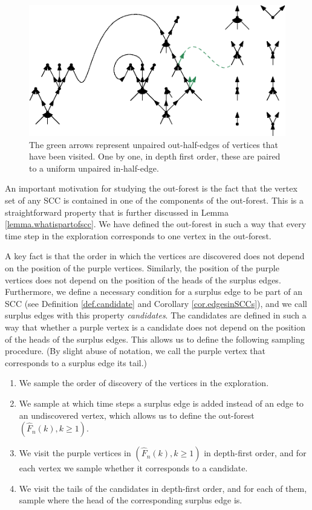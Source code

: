 \begin{figure}
    \centering
    \includegraphics[scale=0.6]{Content/Pictures/configuration_model.eps}
    \caption{The green arrows represent unpaired out-half-edges of vertices that have been visited. One by one, in depth first order, these are paired to a uniform unpaired in-half-edge.}
    \label{fig.configuration model}
\end{figure}

An important motivation for studying the out-forest is the fact that the vertex set of any SCC is contained in one of the components of the out-forest. This is a straightforward property that is further discussed in Lemma \ref{lemma.whatispartofscc}. We have defined the out-forest in such a way that every time step in the exploration corresponds to one vertex in the out-forest. 

A key fact is that the order in which the vertices are discovered does not depend on the position of the purple vertices. Similarly, the position of the purple vertices does not depend on the position of the heads of the surplus edges. Furthermore, we define a necessary condition for a surplus edge to be part of an SCC (see Definition \ref{def.candidate} and Corollary \ref{cor.edgesinSCCs}), and we call surplus edges with this property \emph{candidates}. The candidates are defined in such a way that whether a purple vertex is a candidate does not depend on the position of the heads of the surplus edges. This allows us to define the following sampling procedure. (By slight abuse of notation, we call the purple vertex that corresponds to a surplus edge its tail.)
\begin{enumerate}
    \item We sample the order of discovery of the vertices in the exploration.
    \item We sample at which time steps a surplus edge is added instead of an edge to an undiscovered vertex, which allows us to define the out-forest $(\hat{F}_n(k),k\geq 1)$. 
    \item We visit the purple vertices in $(\hat{F}_n(k),k\geq 1)$ in depth-first order, and for each vertex we sample whether it corresponds to a candidate.
    \item We visit the tails of the candidates in depth-first order, and for each of them, sample where the head of the corresponding surplus edge is.
\end{enumerate}

